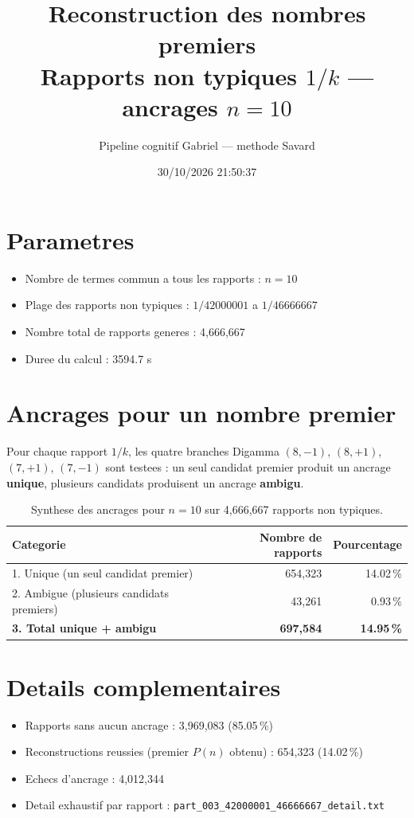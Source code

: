 \documentclass[12pt]{article}
\title{Reconstruction des nombres premiers\\Rapports non typiques $1/k$ --- ancrages $n=10$
}
\author{Pipeline cognitif Gabriel --- methode Savard}
\date{30/10/2026 21:50:37}
\begin{document}
\maketitle

\section*{Parametres}
\begin{itemize}
\item Nombre de termes commun a tous les rapports : $n=10$
\item Plage des rapports non typiques : $1/42000001$ a $1/46666667$
\item Nombre total de rapports generes : 4,666,667
\item Duree du calcul : 3594.7 s
\end{itemize}

\section*{Ancrages pour un nombre premier}

Pour chaque rapport $1/k$, les quatre branches Digamma $(8,-1)$, $(8,+1)$, $(7,+1)$, $(7,-1)$ sont testees : un seul candidat premier produit un ancrage \textbf{unique}, plusieurs candidats produisent un ancrage \textbf{ambigu}.

\begin{table}[h!]
\centering
\caption{Synthese des ancrages pour $n=10$ sur 4,666,667 rapports non typiques.}
\begin{tabular}{lrr}
\toprule
\textbf{Categorie} & \textbf{Nombre de rapports} & \textbf{Pourcentage} \\
\midrule
1. Unique (un seul candidat premier) & 654,323 & 14.02\,\% \\
2. Ambigue (plusieurs candidats premiers) & 43,261 & 0.93\,\% \\
\midrule
\textbf{3. Total unique + ambigu} & \textbf{697,584} & \textbf{14.95\,\%} \\
\bottomrule
\end{tabular}
\end{table}

\section*{Details complementaires}
\begin{itemize}
\item Rapports sans aucun ancrage : 3,969,083 (85.05\,\%)
\item Reconstructions reussies (premier $P(n)$ obtenu) : 654,323 (14.02\,\%)
\item Echecs d'ancrage : 4,012,344
\item Detail exhaustif par rapport : \texttt{part_003_42000001_46666667_detail.txt}
\end{itemize}
\end{document}
